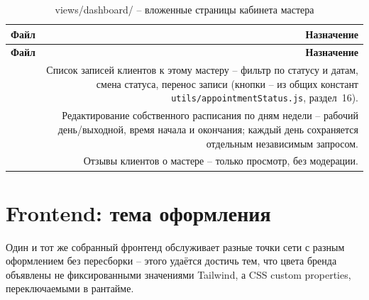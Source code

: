 \begin{xltabular}{\textwidth}{M D}
\caption{views/dashboard/ -- вложенные страницы кабинета мастера} \\
\hline
\textbf{Файл} & \textbf{Назначение} \\
\hline
\endfirsthead
\hline
\textbf{Файл} & \textbf{Назначение} \\
\hline
\endhead
\hline
\endfoot
{} & Список записей клиентов к этому
  мастеру -- фильтр по статусу и датам, смена статуса, перенос записи
  (кнопки -- из общих констант \texttt{utils/appointmentStatus.js},
  раздел~16). \\
 & Редактирование собственного расписания
  по дням недели -- рабочий день/выходной, время начала и окончания;
  каждый день сохраняется отдельным независимым запросом. \\
 & Отзывы клиентов о мастере -- только
  просмотр, без модерации. \\
\end{xltabular}

\section{Frontend: тема оформления}

Один и тот же собранный фронтенд обслуживает разные точки сети с разным
оформлением без пересборки -- этого удаётся достичь тем, что цвета
бренда объявлены не фиксированными значениями Tailwind, а CSS custom
properties, переключаемыми в рантайме.

